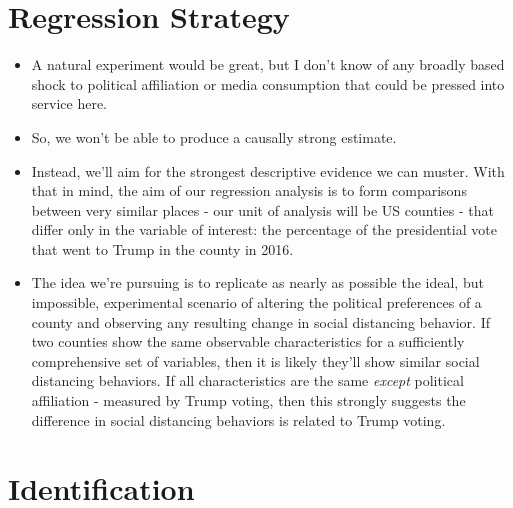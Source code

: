 \documentclass{article}
\begin{document}
\section{Regression Strategy}

\begin{itemize}
	\item A natural experiment would be great, but I don't know of any broadly based shock to political affiliation or media consumption that could be pressed into service here. 
	\item So, we won't be able to produce a causally strong estimate. 
	\item Instead, we'll aim for the strongest descriptive evidence we can muster. With that in mind, the aim of our regression analysis is to form  comparisons between very similar places - our unit of analysis will be US counties - that differ only in the variable of interest: the percentage of the presidential vote that went to Trump in the county in 2016.
	\item The idea we're pursuing is to replicate as nearly as possible the ideal, but impossible, experimental scenario of altering the political preferences of a county and observing any resulting change in social distancing behavior. If two counties show the same observable characteristics for a sufficiently comprehensive set of variables, then it is likely they'll show similar social distancing behaviors. If all characteristics are the same \textit{except} political affiliation - measured by Trump voting, then this strongly suggests the difference in social distancing behaviors is related to Trump voting. 
\end{itemize}

\section{Identification}
\end{document}
